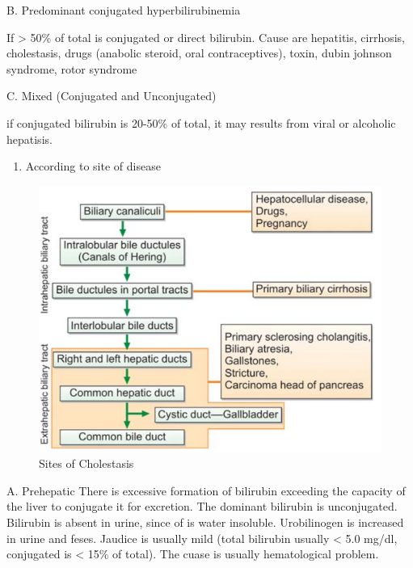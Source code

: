 \documentclass[
  letterpaper,
  DIV=11,
  numbers=noendperiod]{scrreprt}
\providecommand{\tightlist}{%
  \setlength{\itemsep}{0pt}\setlength{\parskip}{0pt}}\usepackage{longtable,booktabs,array}
\begin{document}
B. Predominant conjugated hyperbilirubinemia

If \textgreater{} 50\% of total is conjugated or direct bilirubin. Cause
are hepatitis, cirrhosis, cholestasis, drugs (anabolic steroid, oral
contraceptives), toxin, dubin johnson syndrome, rotor syndrome

C. Mixed (Conjugated and Unconjugated)

if conjugated bilirubin is 20-50\% of total, it may results from viral
or alcoholic hepatisis.

\begin{enumerate}
\def\labelenumi{\arabic{enumi}.}
\setcounter{enumi}{1}
\tightlist
\item
  According to site of disease
\end{enumerate}

\begin{figure}

{\centering \includegraphics{image/Site_Cholestasis.png}

}

\caption{Sites of Cholestasis}

\end{figure}%

A. Prehepatic There is excessive formation of bilirubin exceeding the
capacity of the liver to conjugate it for excretion. The dominant
bilirubin is unconjugated. Bilirubin is absent in urine, since of is
water insoluble. Urobilinogen is increased in urine and feses. Jaudice
is usually mild (total bilirubin usually \textless{} 5.0 mg/dl,
conjugated is \textless{} 15\% of total). The cuase is usually
hematological problem.
\end{document}
